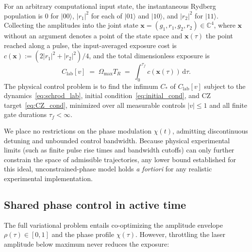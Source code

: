 \documentclass[aps,prx,reprint,nofootinbib,longbibliography,floatfix]{revtex4-2}
\theoremstyle{plain}
\theoremstyle{remark}
\newcommand{\Omax}{\Omega_{\max}}
\newcommand{\TR}{T_{R}}
\newcommand{\dd}{\mathrm{d}}
\newcommand{\bket}[1]{|#1\rangle}
\newcommand{\xv}{\boldsymbol{x}}
\begin{document}
For an arbitrary computational input state, the instantaneous Rydberg population is $0$ for $\bket{00}$, $|r_1|^2$ for each of $\bket{01}$ and $\bket{10}$, and $|r_2|^2$ for $\bket{11}$. Collecting the amplitudes into the joint state $\xv=(g_1,r_1,g_2,r_2)\in\mathbb{C}^4$, where $\xv$ without an argument denotes a point of the state space and $\xv(\tau)$ the point reached along a pulse, the input-averaged exposure cost is $c(\xv):=(2|r_1|^2+|r_2|^2)/4$, and the total dimensionless exposure is
\begin{equation}
C_{\mathrm{lab}}[v] \;=\; \Omax\TR \;=\; \int_0^{\tau_f} c(\xv(\tau))\,\dd\tau.
\label{eq:objective_lab}
\end{equation}
The physical control problem is to find the infimum $C_*$ of $C_{\mathrm{lab}}[v]$ subject to the dynamics~\eqref{eq:schrod_lab}, initial condition~\eqref{eq:initial_cond}, and CZ target~\eqref{eq:CZ_cond}, minimized over all measurable controls $|v| \le 1$ and all finite gate durations $\tau_f < \infty$.

We place no restrictions on the phase modulation $\chi(t)$, admitting discontinuous detuning and unbounded control bandwidth. Because physical experimental limits (such as finite pulse rise times and bandwidth cutoffs) can only further constrain the space of admissible trajectories, any lower bound established for this ideal, unconstrained-phase model holds \emph{a fortiori} for any realistic experimental implementation.

\subsection{Shared phase control in active time}
\label{sec:reduction}

The full variational problem entails co-optimizing the amplitude envelope $\rho(\tau) \in [0, 1]$ and the phase profile $\chi(\tau)$. However, throttling the laser amplitude below maximum never reduces the exposure:
\end{document}
